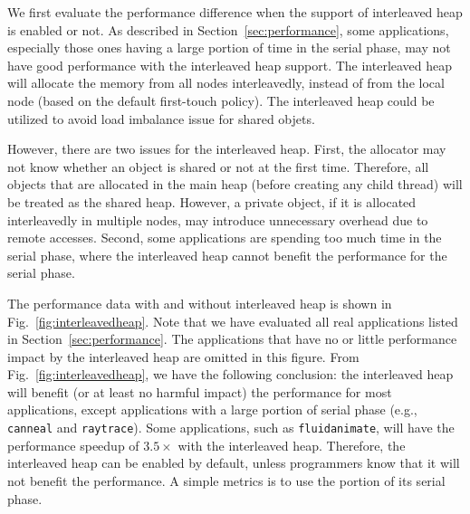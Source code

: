 We first evaluate the performance difference when the support of interleaved heap is enabled or not. As described in Section~\ref{sec:performance}, some applications, especially those ones having a large portion of time in the serial phase, may not have good performance with the interleaved heap support. The interleaved heap will allocate the memory from all nodes interleavedly, instead of from the local node (based on the default first-touch policy). The interleaved heap could be utilized to avoid load imbalance issue for shared objets. 

However, there are two issues for the interleaved heap. First, the allocator may not know whether an object is shared or not at the first time. Therefore, all objects that are allocated in the main heap (before creating any child thread) will be treated as the shared heap. However, a private object, if it is allocated interleavedly in multiple nodes, may introduce unnecessary overhead due to remote accesses. Second, some applications are spending too much time in the serial phase, where the interleaved heap cannot benefit the performance for the serial phase. 

The performance data with and without interleaved heap is shown in Fig.~\ref{fig:interleavedheap}. Note that we have evaluated all real applications listed in Section~\ref{sec:performance}. The applications that have no or little performance impact by the interleaved heap are omitted in this figure. From Fig.~\ref{fig:interleavedheap}, we have the following conclusion: the interleaved heap will benefit (or at least no harmful impact) the performance for most applications, except applications with a large portion of serial phase (e.g., \texttt{canneal} and \texttt{raytrace}). Some applications, such as \texttt{fluidanimate}, will have the performance speedup of $3.5\times$ with the interleaved heap. Therefore, the interleaved heap can be enabled by default, unless programmers know that it will not benefit the performance. A simple metrics is to use the portion of its serial phase. 



